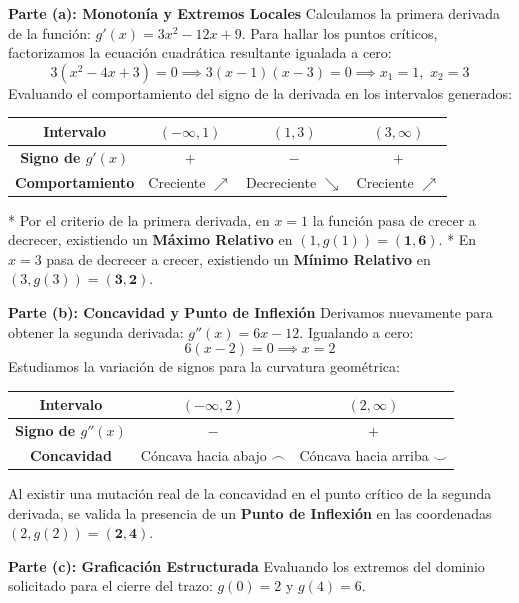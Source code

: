 \documentclass[11pt,paper=a4,answers, addpoints]{exam}
\begin{document}
\begin{questions}
\begin{solution}
\textbf{Parte (a): Monotonía y Extremos Locales}
Calculamos la primera derivada de la función: $g'(x) = 3x^2 - 12x + 9$. Para hallar los puntos críticos, factorizamos la ecuación cuadrática resultante igualada a cero:
\[
3(x^2 - 4x + 3) = 0 \implies 3(x-1)(x-3) = 0 \implies x_1 = 1, \,\, x_2 = 3
\]
Evaluando el comportamiento del signo de la derivada en los intervalos generados:
\begin{center}
\renewcommand{\arraystretch}{1.3}
\begin{tabular}{|c|c|c|c|}
\hline
\textbf{Intervalo} & $(-\infty, 1)$ & $(1, 3)$ & $(3, \infty)$ \\ \hline
\textbf{Signo de $g'(x)$} & $+$ & $-$ & $+$ \\ \hline
\textbf{Comportamiento} & Creciente $\nearrow$ & Decreciente $\searrow$ & Creciente $\nearrow$ \\ \hline
\end{tabular}
\end{center}
* Por el criterio de la primera derivada, en $x=1$ la función pasa de crecer a decrecer, existiendo un \textbf{Máximo Relativo} en $(1, g(1)) = \mathbf{(1, 6)}$.
* En $x=3$ pasa de decrecer a crecer, existiendo un \textbf{Mínimo Relativo} en $(3, g(3)) = \mathbf{(3, 2)}$.

\medskip
\textbf{Parte (b): Concavidad y Punto de Inflexión}
Derivamos nuevamente para obtener la segunda derivada: $g''(x) = 6x - 12$. Igualando a cero:
\[
6(x - 2) = 0 \implies x = 2
\]
Estudiamos la variación de signos para la curvatura geométrica:
\begin{center}
\renewcommand{\arraystretch}{1.3}
\begin{tabular}{|c|c|c|}
\hline
\textbf{Intervalo} & $(-\infty, 2)$ & $(2, \infty)$ \\ \hline
\textbf{Signo de $g''(x)$} & $-$ & $+$ \\ \hline
\textbf{Concavidad} & Cóncava hacia abajo $\frown$ & Cóncava hacia arriba $\smile$ \\ \hline
\end{tabular}
\end{center}
Al existir una mutación real de la concavidad en el punto crítico de la segunda derivada, se valida la presencia de un \textbf{Punto de Inflexión} en las coordenadas $(2, g(2)) = \mathbf{(2, 4)}$.

\medskip
\textbf{Parte (c): Graficación Estructurada}
Evaluando los extremos del dominio solicitado para el cierre del trazo: $g(0) = 2$ y $g(4) = 6$.


\end{solution}
\end{questions}
\end{document}
